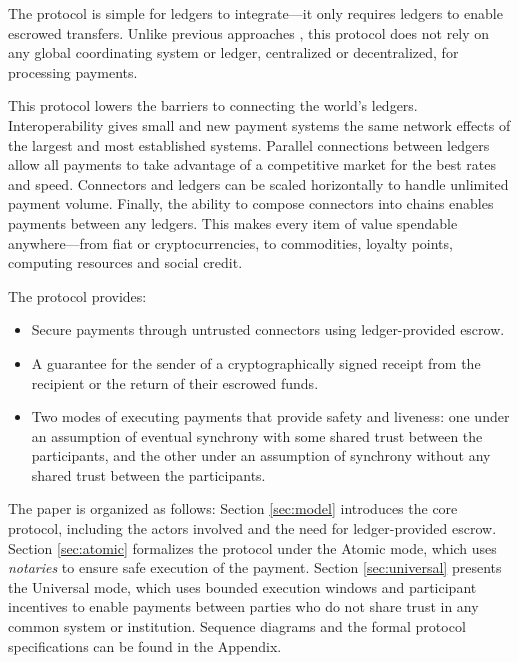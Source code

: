 \documentclass[letterpaper,twocolumn,10pt]{article}
\begin{document}
The protocol is simple for ledgers to integrate---it only requires ledgers to enable escrowed transfers.
Unlike previous approaches \cite{davies1989security} \cite{Bitcoin}\cite{schwartz2014ripple}\cite{wood2014ethereum}\cite{mazieresstellar}\cite{back2014enabling}\cite{poonbitcoin}, this protocol does not rely on any global coordinating system or ledger, centralized or decentralized, for processing payments.

This protocol lowers the barriers to connecting the world's ledgers. Interoperability gives small and new payment systems the same network effects of the largest and most established systems. Parallel connections between ledgers allow all payments to take advantage of a competitive market for the best rates and speed. Connectors and ledgers can be scaled horizontally to handle unlimited payment volume. Finally, the ability to compose connectors into chains enables payments between any ledgers. This makes every item of value spendable anywhere---from fiat or cryptocurrencies, to commodities, loyalty points, computing resources and social credit.

The protocol provides:
\begin{itemize}
\item Secure payments through untrusted connectors using ledger-provided escrow.
\item A guarantee for the sender of a cryptographically signed receipt from the recipient or the return of their escrowed funds.
\item Two modes of executing payments that provide safety and liveness: one under an assumption of eventual synchrony with some shared trust between the participants, and the other under an assumption of synchrony without any shared trust between the participants.
\end{itemize}

The paper is organized as follows: Section \ref{sec:model} introduces the core protocol, including the actors involved and the need for ledger-provided escrow. Section \ref{sec:atomic} formalizes the protocol under the Atomic mode, which uses \textit{notaries} to ensure safe execution of the payment. Section \ref{sec:universal} presents the Universal mode, which uses bounded execution windows and participant incentives to enable payments between parties who do not share trust in any common system or institution. Sequence diagrams and the formal protocol specifications can be found in the Appendix.
\end{document}

